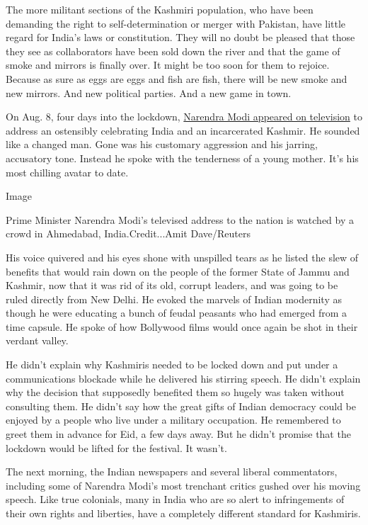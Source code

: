 The more militant sections of the Kashmiri population, who have been
demanding the right to self-determination or merger with Pakistan, have
little regard for India's laws or constitution. They will no doubt be
pleased that those they see as collaborators have been sold down the
river and that the game of smoke and mirrors is finally over. It might
be too soon for them to rejoice. Because as sure as eggs are eggs and
fish are fish, there will be new smoke and new mirrors. And new
political parties. And a new game in town.

On Aug. 8, four days into the lockdown,
\href{https://www.youtube.com/watch?v=n0bNYhPJnxk}{Narendra Modi
appeared on television} to address an ostensibly celebrating India and
an incarcerated Kashmir. He sounded like a changed man. Gone was his
customary aggression and his jarring, accusatory tone. Instead he spoke
with the tenderness of a young mother. It's his most chilling avatar to
date.

Image

Prime Minister Narendra Modi's televised address to the nation is
watched by a crowd in Ahmedabad, India.Credit...Amit Dave/Reuters

His voice quivered and his eyes shone with unspilled tears as he listed
the slew of benefits that would rain down on the people of the former
State of Jammu and Kashmir, now that it was rid of its old, corrupt
leaders, and was going to be ruled directly from New Delhi. He evoked
the marvels of Indian modernity as though he were educating a bunch of
feudal peasants who had emerged from a time capsule. He spoke of how
Bollywood films would once again be shot in their verdant valley.

He didn't explain why Kashmiris needed to be locked down and put under a
communications blockade while he delivered his stirring speech. He
didn't explain why the decision that supposedly benefited them so hugely
was taken without consulting them. He didn't say how the great gifts of
Indian democracy could be enjoyed by a people who live under a military
occupation. He remembered to greet them in advance for Eid, a few days
away. But he didn't promise that the lockdown would be lifted for the
festival. It wasn't.

The next morning, the Indian newspapers and several liberal
commentators, including some of Narendra Modi's most trenchant critics
gushed over his moving speech. Like true colonials, many in India who
are so alert to infringements of their own rights and liberties, have a
completely different standard for Kashmiris.

